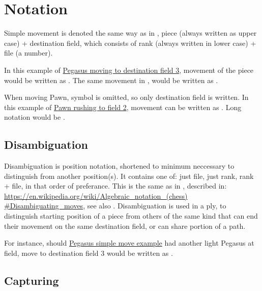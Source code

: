\clearpage %

\section*{Notation}
\label{sec:Appendix/Notation}

Simple movement is denoted the same way as in , piece (always written as upper
case) + destination field, which consists of rank (always written in lower case) + file
(a number).

In this example of \hyperref[fig:scn_ct_03_define_step_ply]{Pegasus moving to destination
field 3}, movement of the piece would be written as . The same movement in
, would be written as .

When moving Pawn, symbol is omitted, so only destination field is written. In this example
of \hyperref[fig:04_croatian_ties_en_passant]{Pawn rushing to field 2}, movement can be
written as . Long notation would be .

\subsection*{Disambiguation}
\label{sec:Appendix/Notation/Disambiguation}

Disambiguation is position notation, shortened to minimum neccessary to distinguish from
another position(s). It contains one of: just file, just rank, rank + file, in that order
of preferance. This is the same as in , described in: \\
\href{https://en.wikipedia.org/wiki/Algebraic\_notation\_(chess)\#Disambiguating\_moves}{https://en.wikipedia.org/wiki/Algebraic\_notation\_(chess)\\
\#Disambiguating\_moves}, see also .
Disambiguation is used in a ply, to distinguish starting position of a piece from others
of the same kind that can end their movement on the same destination field, or can share
portion of a path.

For instance, should \hyperref[fig:scn_ct_03_define_step_ply]{Pegasus simple move example}
had another light Pegasus at  field, move to destination field 3 would be written
as .

\vfill

\subsection*{Capturing}
\label{sec:Appendix/Notation/Capturing}

